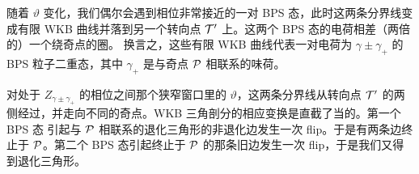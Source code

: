 随着 $\vartheta$ 变化，我们偶尔会遇到相位非常接近的一对 BPS 态，此时这两条分界线变成有限
WKB 曲线并落到另一个转向点 $\mathcal{T}'$ 上。这两个 BPS 态的电荷相差（两倍的）一个绕奇点的圈。
换言之，这些有限 WKB 曲线代表一对电荷为 $\gamma \pm \gamma_+$ 的 BPS 粒子二重态，其中
$\gamma_+$ 是与奇点 $\mathcal{P}$ 相联系的味荷。

对处于 $Z_{\gamma \pm \gamma_+}$ 的相位之间那个狭窄窗口里的 $\vartheta$，这两条分界线从转向点
$\mathcal{T}'$ 的两侧经过，并走向不同的奇点。WKB 三角剖分的相应变换是直截了当的。第一个 BPS 态
引起与 $\mathcal{P}$ 相联系的退化三角形的非退化边发生一次 flip。于是有两条边终止于 $\mathcal{P}$。第二个
BPS 态引起终止于 $\mathcal{P}$ 的那条旧边发生一次 flip，于是我们又得到退化三角形。
